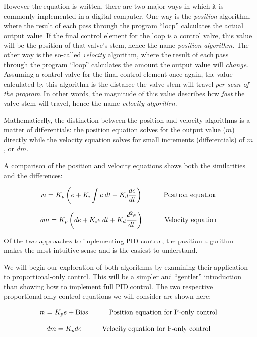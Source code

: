 However the equation is written, there are two major ways in which it is commonly implemented in a digital computer.  One way is the \textit{position} algorithm, where the result of each pass through the program ``loop'' calculates the actual output value.  If the final control element for the loop is a control valve, this value will be the position of that valve's stem, hence the name \textit{position algorithm}.  The other way is the so-called \textit{velocity} algorithm, where the result of each pass through the program ``loop'' calculates the amount the output value will \textit{change}.  Assuming a control valve for the final control element once again, the value calculated by this algorithm is the distance the valve stem will travel \textit{per scan of the program}.  In other words, the magnitude of this value describes how \textit{fast} the valve stem will travel, hence the name \textit{velocity algorithm}.    

Mathematically, the distinction between the position and velocity algorithms is a matter of differentials: the position equation solves for the output value ($m$) directly while the velocity equation solves for small increments (differentials) of $m$, or $dm$.

A comparison of the position and velocity equations shows both the similarities and the differences:

$$m = K_p \left(e + K_i \int e \> dt + K_d {de \over dt} \right) \hskip 30pt \hbox{Position equation}$$

$$dm = K_p \left(de + K_i  e \> dt + K_d {d^2e \over dt} \right) \hskip 30pt \hbox{Velocity equation}$$

Of the two approaches to implementing PID control, the position algorithm makes the most intuitive sense and is the easiest to understand.

\vskip 10pt

\filbreak

We will begin our exploration of both algorithms by examining their application to proportional-only control.  This will be a simpler and ``gentler'' introduction than showing how to implement full PID control.  The two respective proportional-only control equations we will consider are shown here:

$$m = K_p e + \hbox{Bias} \hskip 30pt \hbox{Position equation for P-only control}$$

$$dm = K_p de \hskip 30pt \hbox{Velocity equation for P-only control}$$


